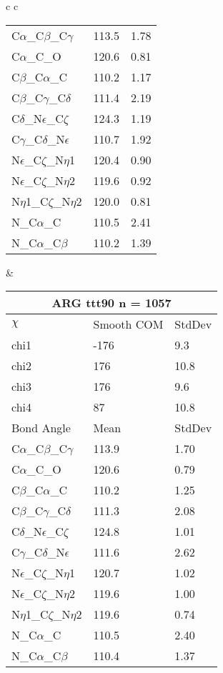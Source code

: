 \begin{longtable}{ c c }
\begin{tabular}{ l l l }
  C$\alpha$\_C$\beta$\_C$\gamma$ & 113.5 & 1.78\\
  C$\alpha$\_C\_O & 120.6 & 0.81\\
  C$\beta$\_C$\alpha$\_C & 110.2 & 1.17\\
  C$\beta$\_C$\gamma$\_C$\delta$ & 111.4 & 2.19\\
  C$\delta$\_N$\epsilon$\_C$\zeta$ & 124.3 & 1.19\\
  C$\gamma$\_C$\delta$\_N$\epsilon$ & 110.7 & 1.92\\
  N$\epsilon$\_C$\zeta$\_N$\eta$1 & 120.4 & 0.90\\
  N$\epsilon$\_C$\zeta$\_N$\eta$2 & 119.6 & 0.92\\
  N$\eta$1\_C$\zeta$\_N$\eta$2 & 120.0 & 0.81\\
  N\_C$\alpha$\_C & 110.5 & 2.41\\
  N\_C$\alpha$\_C$\beta$ & 110.2 & 1.39\\
  \bottomrule
  \end{tabular}
  &
  \begin{tabular}{ l l l }
  \toprule
  \multicolumn{3}{c}{ARG \textbf{ttt90} n = 1057} \\ \toprule
  $\chi$       & Smooth COM & StdDev \\ \midrule
  chi1 & -176 & 9.3 \\ 
  chi2 & 176 & 10.8 \\ 
  chi3 & 176 & 9.6 \\ 
  chi4 & 87 & 10.8 \\ \midrule
  Bond Angle   & Mean     & StdDev \\ \midrule
  C$\alpha$\_C$\beta$\_C$\gamma$ & 113.9 & 1.70\\
  C$\alpha$\_C\_O & 120.6 & 0.79\\
  C$\beta$\_C$\alpha$\_C & 110.2 & 1.25\\
  C$\beta$\_C$\gamma$\_C$\delta$ & 111.3 & 2.08\\
  C$\delta$\_N$\epsilon$\_C$\zeta$ & 124.8 & 1.01\\
  C$\gamma$\_C$\delta$\_N$\epsilon$ & 111.6 & 2.62\\
  N$\epsilon$\_C$\zeta$\_N$\eta$1 & 120.7 & 1.02\\
  N$\epsilon$\_C$\zeta$\_N$\eta$2 & 119.6 & 1.00\\
  N$\eta$1\_C$\zeta$\_N$\eta$2 & 119.6 & 0.74\\
  N\_C$\alpha$\_C & 110.5 & 2.40\\
  N\_C$\alpha$\_C$\beta$ & 110.4 & 1.37\\
  \bottomrule

\end{tabular}
\end{longtable}
